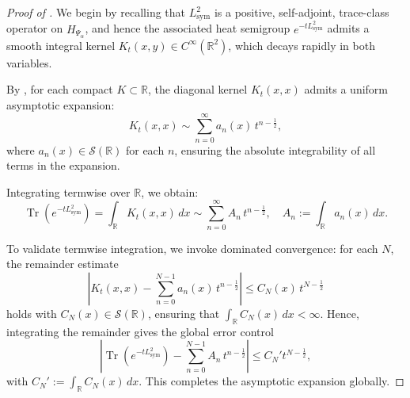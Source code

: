 \begin{proof}[Proof of ]
We begin by recalling that \( L_{\mathrm{sym}}^2 \) is a positive, self-adjoint, trace-class operator on \( H_{\Psi_\alpha} \), and hence the associated heat semigroup \( e^{-t L_{\mathrm{sym}}^2} \) admits a smooth integral kernel \( K_t(x,y) \in C^\infty(\mathbb{R}^2) \), which decays rapidly in both variables.

By , for each compact \( K \subset \mathbb{R} \), the diagonal kernel \( K_t(x,x) \) admits a uniform asymptotic expansion:
\[
K_t(x,x) \sim \sum_{n=0}^{\infty} a_n(x)\, t^{n - \frac{1}{2}},
\]
where \( a_n(x) \in \mathcal{S}(\mathbb{R}) \) for each \( n \), ensuring the absolute integrability of all terms in the expansion.

Integrating termwise over \( \mathbb{R} \), we obtain:
\[
\operatorname{Tr}(e^{-t L_{\mathrm{sym}}^2}) = \int_{\mathbb{R}} K_t(x,x)\, dx \sim \sum_{n=0}^{\infty} A_n\, t^{n - \frac{1}{2}}, \quad A_n := \int_{\mathbb{R}} a_n(x)\, dx.
\]

To validate termwise integration, we invoke dominated convergence: for each \( N \), the remainder estimate
\[
\left| K_t(x,x) - \sum_{n=0}^{N-1} a_n(x)\, t^{n - \frac{1}{2}} \right| \le C_N(x)\, t^{N - \frac{1}{2}}
\]
holds with \( C_N(x) \in \mathcal{S}(\mathbb{R}) \), ensuring that \( \int_{\mathbb{R}} C_N(x)\, dx < \infty \). Hence, integrating the remainder gives the global error control
\[
\left| \operatorname{Tr}(e^{-t L_{\mathrm{sym}}^2}) - \sum_{n=0}^{N-1} A_n\, t^{n - \frac{1}{2}} \right| \le C_N' t^{N - \frac{1}{2}},
\]
with \( C_N' := \int_{\mathbb{R}} C_N(x)\, dx \). This completes the asymptotic expansion globally.
\end{proof}
